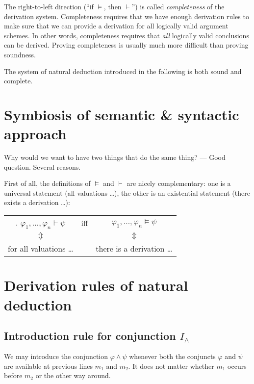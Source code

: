 \documentclass[nobib,nofonts]{tufte-handout}
\begin{document}
The right-to-left direction (``if $\models$, then $\vdash$'') is called \emph{completeness} of the derivation system.
Completeness requires that we have enough derivation rules to make sure that we can provide a derivation for all logically valid argument schemes.
In other words, completeness requires that \emph{all} logically valid conclusions can be derived.
Proving completeness is usually much more difficult than proving soundness.

The system of natural deduction introduced in the following is both sound and complete.

\section{Symbiosis of semantic \& syntactic approach}

Why would we want to have two things that do the same thing? ---
Good question.
Several reasons.

First of all, the definitions of $\models$ and $\vdash$ are nicely complementary: one is a universal statement (all valuations \dots), the other is an existential statement (there exists a derivation \dots):

  \begin{center}
    \begin{tabular}{ccc}.
      $\varphi_{1}, \dots, \varphi_{n} \vdash \psi$ &
      iff &
      $\varphi_{1}, \dots, \varphi_{n} \models \psi$ \\
      $\Updownarrow$ & & $\Updownarrow$ \\
      for all valuations \dots && there is a derivation \dots
    \end{tabular}
  \end{center}




\section{Derivation rules of natural deduction}

\subsection{Introduction rule for conjunction $I_{\wedge}$}

We may introduce the conjunction $\varphi \wedge \psi$ whenever both the conjuncts $\varphi$ and $\psi$ are available at previous lines $m_{1}$ and $m_{2}$. It does not matter whether $m_{1}$ occurs before $m_{2}$ or the other way around.
\end{document}
